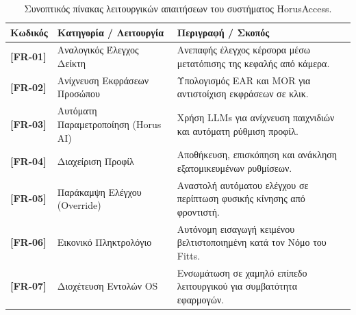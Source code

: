 \documentclass[twoside, a4paper, 11pt]{article}
\newcommand{\textlatin}[1]{\textenglish{#1}}
\begin{document}
\begin{table}[!htbp]
\centering
\begin{tabular}{|l|p{4cm}|p{6.5cm}|}
\hline
\textbf{Κωδικός} & \textbf{Κατηγορία / Λειτουργία} & \textbf{Περιγραφή / Σκοπός} \\ \hline
\textbf{[FR-01]} & Αναλογικός Έλεγχος Δείκτη & Ανεπαφής έλεγχος κέρσορα μέσω μετατόπισης της κεφαλής από κάμερα. \\ \hline
\textbf{[FR-02]} & Ανίχνευση Εκφράσεων Προσώπου & Υπολογισμός \textlatin{EAR} και \textlatin{MOR} για αντιστοίχιση εκφράσεων σε κλικ. \\ \hline
\textbf{[FR-03]} & Αυτόματη Παραμετροποίηση (\textlatin{Horus AI}) & Χρήση \textlatin{LLMs} για ανίχνευση παιχνιδιών και αυτόματη ρύθμιση προφίλ. \\ \hline
\textbf{[FR-04]} & Διαχείριση Προφίλ & Αποθήκευση, επισκόπηση και ανάκληση εξατομικευμένων ρυθμίσεων. \\ \hline
\textbf{[FR-05]} & Παράκαμψη Ελέγχου (\textlatin{Override}) & Αναστολή αυτόματου ελέγχου σε περίπτωση φυσικής κίνησης από φροντιστή. \\ \hline
\textbf{[FR-06]} & Εικονικό Πληκτρολόγιο & Αυτόνομη εισαγωγή κειμένου βελτιστοποιημένη κατά τον Νόμο του \textlatin{Fitts}. \\ \hline
\textbf{[FR-07]} & Διοχέτευση Εντολών \textlatin{OS} & Ενσωμάτωση σε χαμηλό επίπεδο λειτουργικού για συμβατότητα εφαρμογών. \\ \hline
\end{tabular}
\caption{Συνοπτικός πίνακας λειτουργικών απαιτήσεων του συστήματος \textlatin{HorusAccess}.}
\label{tab:fr_summary}
\end{table}

\clearpage
\end{document}

